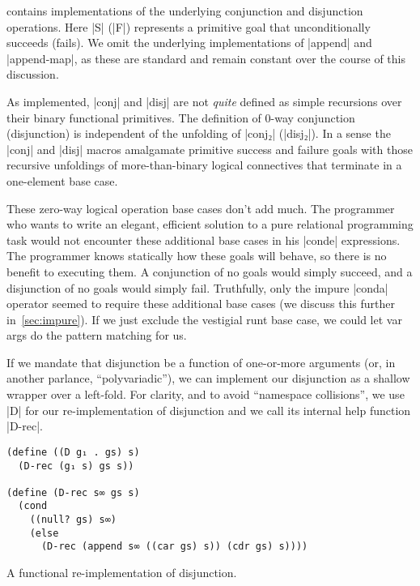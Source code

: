 \documentclass[sigplan,screen,draft,anonymous,review,natbib=false]{acmart}
\begin{document}
 contains implementations of
the underlying conjunction and disjunction operations. Here
\rackinline|S| (\rackinline|F|) represents a primitive goal that
unconditionally succeeds (fails). We omit the underlying
implementations of \rackinline|append| and \rackinline|append-map|, as
these are standard and remain constant over the course of this
discussion.

As implemented, \rackinline|conj| and \rackinline|disj| are not
\emph{quite} defined as simple recursions over their binary functional
primitives. The definition of 0-way conjunction (disjunction) is
independent of the unfolding of \rackinline|conj₂|
(\rackinline|disj₂|). In a sense the \rackinline|conj| and
\rackinline|disj| macros amalgamate primitive success and failure
goals with those recursive unfoldings of more-than-binary logical
connectives that terminate in a one-element base case.

These zero-way logical operation base cases don't add much. The
programmer who wants to write an elegant, efficient solution to a pure
relational programming task would not encounter these additional base
cases in his \rackinline|conde| expressions. The programmer knows
statically how these goals will behave, so there is no benefit to
executing them. A conjunction of no goals would simply succeed, and a
disjunction of no goals would simply fail. Truthfully, only the impure
\rackinline|conda| operator seemed to require these additional base
cases (we discuss this further in~\cref{sec:impure}). If we just
exclude the vestigial runt base case, we could let var args do the
pattern matching for us.

If we mandate that disjunction be a function of one-or-more arguments
(or, in another parlance, \enquote{polyvariadic}), we can implement
our disjunction as a shallow wrapper over a left-fold. For clarity,
and to avoid \enquote{namespace collisions}, we use \rackinline|D| for
our re-implementation of disjunction and we call its internal help
function \rackinline|D-rec|.

\begin{listing}
  \begin{verbatim}
(define ((D g₁ . gs) s)
  (D-rec (g₁ s) gs s))

(define (D-rec s∞ gs s)
  (cond
    ((null? gs) s∞)
    (else
      (D-rec (append s∞ ((car gs) s)) (cdr gs) s))))
  \end{verbatim}
  \caption{A functional re-implementation of disjunction.}
  \label{mnt:disj-re-implementation}
\end{listing}
\end{document}

